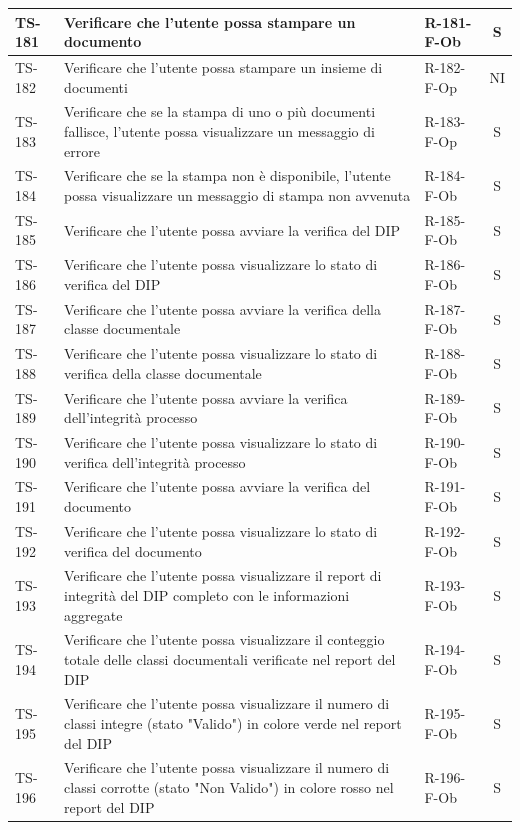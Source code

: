 \documentclass[a4paper,12pt]{article}
\begin{document}
\begin{longtable}{|p{1.5cm}|p{8.3cm}|p{2.4cm}|c|}
\hline
TS-181 & Verificare che l'utente possa stampare un documento & R-181-F-Ob & S \\
\hline
TS-182 & Verificare che l'utente possa stampare un insieme di documenti & R-182-F-Op & NI \\
\hline
TS-183 & Verificare che se la stampa di uno o più documenti fallisce, l'utente possa visualizzare un messaggio di errore & R-183-F-Op & S \\
\hline
TS-184 & Verificare che se la stampa non è disponibile, l'utente possa visualizzare un messaggio di stampa non avvenuta & R-184-F-Ob & S \\
\hline
TS-185 & Verificare che l'utente possa avviare la verifica del DIP & R-185-F-Ob & S \\
\hline
TS-186 & Verificare che l'utente possa visualizzare lo stato di verifica del DIP & R-186-F-Ob & S \\
\hline
TS-187 & Verificare che l'utente possa avviare la verifica della classe documentale & R-187-F-Ob & S \\
\hline
TS-188 & Verificare che l'utente possa visualizzare lo stato di verifica della classe documentale & R-188-F-Ob & S \\
\hline
TS-189 & Verificare che l'utente possa avviare la verifica dell'integrità processo & R-189-F-Ob & S \\
\hline
TS-190 & Verificare che l'utente possa visualizzare lo stato di verifica dell'integrità processo & R-190-F-Ob & S \\
\hline
TS-191 & Verificare che l'utente possa avviare la verifica del documento & R-191-F-Ob & S \\
\hline
TS-192 & Verificare che l'utente possa visualizzare lo stato di verifica del documento & R-192-F-Ob & S \\
\hline
TS-193 & Verificare che l'utente possa visualizzare il report di integrità del DIP completo con le informazioni aggregate & R-193-F-Ob & S \\
\hline
TS-194 & Verificare che l'utente possa visualizzare il conteggio totale delle classi documentali verificate nel report del DIP & R-194-F-Ob & S \\
\hline
TS-195 & Verificare che l'utente possa visualizzare il numero di classi integre (stato "Valido") in colore verde nel report del DIP & R-195-F-Ob & S \\
\hline
TS-196 & Verificare che l'utente possa visualizzare il numero di classi corrotte (stato "Non Valido") in colore rosso nel report del DIP & R-196-F-Ob & S \\

\end{longtable}
\end{document}
